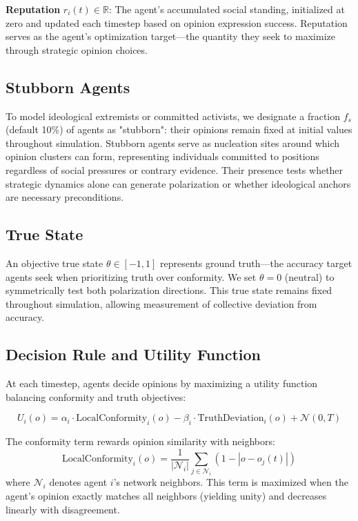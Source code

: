 \documentclass[11pt,a4paper]{article}
\begin{document}
\textbf{Reputation} $r_i(t) \in \mathbb{R}$: The agent's accumulated social standing, initialized at zero and updated each timestep based on opinion expression success. Reputation serves as the agent's optimization target—the quantity they seek to maximize through strategic opinion choices.

\subsection{Stubborn Agents}

To model ideological extremists or committed activists, we designate a fraction $f_s$ (default 10\%) of agents as "stubborn": their opinions remain fixed at initial values throughout simulation. Stubborn agents serve as nucleation sites around which opinion clusters can form, representing individuals committed to positions regardless of social pressures or contrary evidence. Their presence tests whether strategic dynamics alone can generate polarization or whether ideological anchors are necessary preconditions.

\subsection{True State}

An objective true state $\theta \in [-1, 1]$ represents ground truth—the accuracy target agents seek when prioritizing truth over conformity. We set $\theta = 0$ (neutral) to symmetrically test both polarization directions. This true state remains fixed throughout simulation, allowing measurement of collective deviation from accuracy.

\subsection{Decision Rule and Utility Function}

At each timestep, agents decide opinions by maximizing a utility function balancing conformity and truth objectives:

\begin{equation}
U_i(o) = \alpha_i \cdot \text{LocalConformity}_i(o) - \beta_i \cdot \text{TruthDeviation}_i(o) + \mathcal{N}(0, T)
\end{equation}

The conformity term rewards opinion similarity with neighbors:
\begin{equation}
\text{LocalConformity}_i(o) = \frac{1}{|\mathcal{N}_i|} \sum_{j \in \mathcal{N}_i} \left(1 - |o - o_j(t)|\right)
\end{equation}
where $\mathcal{N}_i$ denotes agent $i$'s network neighbors. This term is maximized when the agent's opinion exactly matches all neighbors (yielding unity) and decreases linearly with disagreement.
\end{document}
